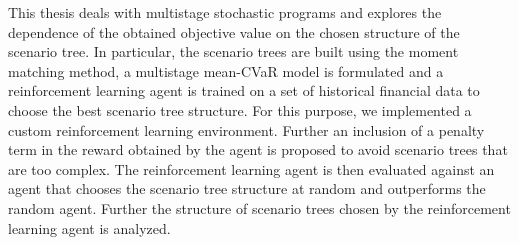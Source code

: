 \documentclass[12pt]{report}
\begin{document}

This thesis deals with multistage stochastic programs and explores the dependence of the obtained objective value on the chosen structure of the scenario tree. In particular, the scenario trees are built using the moment matching method, a multistage mean-CVaR model is formulated and a reinforcement learning agent is trained on a set of historical financial data to choose the best scenario tree structure. For this purpose, we implemented a custom reinforcement learning environment. Further an inclusion of a penalty term in the reward obtained by the agent is proposed to avoid scenario trees that are too complex. The reinforcement learning agent is then evaluated against an agent that chooses the scenario tree structure at random and outperforms the random agent. Further the structure of scenario trees chosen by the reinforcement learning agent is analyzed.
\end{document}
